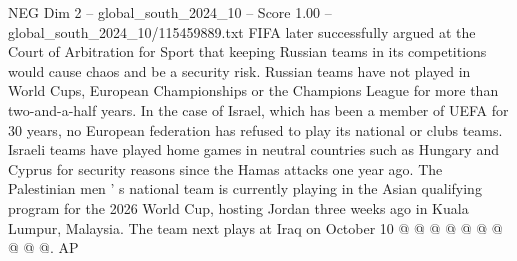 \begin{textsample}{NEG Dim 2 – global\_south\_2024\_10 – Score 1.00 – global\_south\_2024\_10/115459889.txt}
FIFA later successfully argued at the Court of Arbitration for Sport that keeping Russian teams in its competitions would cause chaos and be a security risk.
Russian teams have not played in World Cups, European Championships or the Champions League for more than two-and-a-half years.
In the case of Israel, which has been a member of UEFA for 30 years, no European federation has refused to play its national or clubs teams.
Israeli teams have played home games in neutral countries such as Hungary and Cyprus for security reasons since the Hamas attacks one year ago.
The Palestinian men ' s national team is currently playing in the Asian qualifying program for the 2026 World Cup, hosting Jordan three weeks ago in Kuala Lumpur, Malaysia.
The team next plays at Iraq on October 10 @ @ @ @ @ @ @ @ @ @.
AP

\end{textsample}
